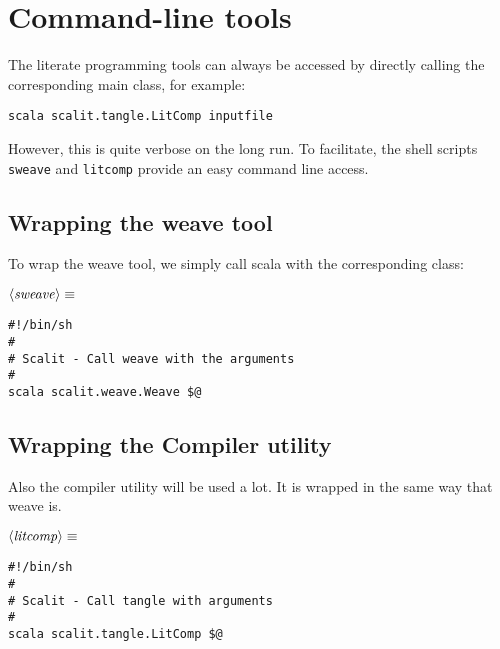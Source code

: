 \documentclass[a4paper,12pt]{article}
\begin{document}
\section{Command-line tools}
The literate programming tools can always be accessed by directly calling the
corresponding main class, for example:

\begin{verbatim}
scala scalit.tangle.LitComp inputfile
\end{verbatim}

However, this is quite verbose on the long run. To facilitate, the shell scripts
\texttt{sweave} and \texttt{litcomp} provide an easy command line access.

\subsection{Wrapping the weave tool}
To wrap the weave tool, we simply call scala with the corresponding class:

$\left<\mbox{\emph{sweave}}\right>\equiv$
\begin{verbatim}#!/bin/sh
#
# Scalit - Call weave with the arguments
#
scala scalit.weave.Weave $@

\end{verbatim}
\subsection{Wrapping the Compiler utility}
Also the compiler utility will be used a lot. It is wrapped in the same way
that weave is.

$\left<\mbox{\emph{litcomp}}\right>\equiv$
\begin{verbatim}#!/bin/sh
#
# Scalit - Call tangle with arguments
#
scala scalit.tangle.LitComp $@
\end{verbatim}
\end{document}
